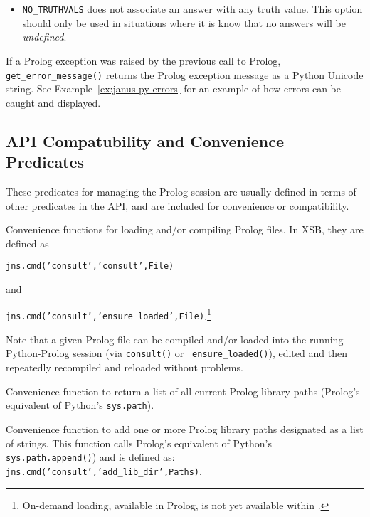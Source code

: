 \begin{description}
\begin{itemize}
      \item {\tt NO\_TRUTHVALS} does not associate an answer with any
        truth value.  This option should only be used in situations
        where it is know that no answers will be {\em undefined}.
        \ei
  \end{itemize}

  If a Prolog exception was raised by the previous call to Prolog, {\tt
    get\_error\_message()} returns the Prolog exception message as a
  Python Unicode string.  See Example~\ref{ex:janus-py-errors} for an
  example of how errors can be caught and displayed.
  
\end{description}

\subsection{\januspy{} API Compatubility and Convenience Predicates}

These predicates for managing the Prolog session are usually defined
in terms of other predicates in the \januspy{} API, and are included
for convenience or compatibility.

\begin{description}

%
  Convenience functions for loading and/or compiling Prolog files.  In
  XSB, they are defined as

  {\tt jns.cmd('consult','consult',File)}

\noindent
and

  {\tt jns.cmd('consult','ensure\_loaded',File)}.\footnote{On-demand
  loading, available in Prolog, is not yet available within \januspy{}.}

  Note that a given Prolog file can be compiled and/or loaded into the
  running Python-Prolog session (via {\tt consult()} or {\tt
    ensure\_loaded()}), edited and then repeatedly recompiled and
    reloaded without problems.

%  
  Convenience function to return a list of all current Prolog library
  paths (Prolog's equivalent of Python's {\tt sys.path}).

%  
    Convenience function to add one or more Prolog library paths
    designated as a list of strings.  This function calls Prolog's
    equivalent of Python's {\tt sys.path.append()}) and is defined as:
    {\tt jns.cmd('consult','add\_lib\_dir',Paths)}.
  
\end{description}

